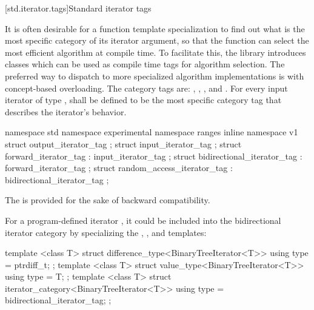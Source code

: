 [std.iterator.tags]{Standard iterator tags}

\pnum
{}%
%
%
%
%
It is often desirable for a
function template specialization
to find out what is the most specific category of its iterator
argument, so that the function can select the most efficient algorithm at compile time.
To facilitate this, the
library introduces
classes which can be used as compile time tags for algorithm selection.
\enternote The preferred way to dispatch to more specialized algorithm implementations is
with concept-based overloading.\exitnote
The category tags are:
,
,
,
and
.
For every input iterator of type
,
shall be defined to be the most specific category tag that describes the
iterator's behavior.

\begin{codeblock}
namespace std { namespace experimental { namespace ranges { inline namespace v1 {
  struct output_iterator_tag { };
  struct input_iterator_tag { };
  struct forward_iterator_tag : input_iterator_tag { };
  struct bidirectional_iterator_tag : forward_iterator_tag { };
  struct random_access_iterator_tag : bidirectional_iterator_tag { };
}}}}
\end{codeblock}

\pnum
\enternote
The  is provided for the sake of backward compatibility.
\exitnote

\pnum
{}%
%
%
%
%
%
\enterexample
For a program-defined iterator
,
it could be included
into the bidirectional iterator category by specializing the
, , and
 templates:

\begin{codeblock}
template <class T> struct difference_type<BinaryTreeIterator<T>> {
  using type = ptrdiff_t;
};
template <class T> struct value_type<BinaryTreeIterator<T>> {
  using type = T;
};
template <class T> struct iterator_category<BinaryTreeIterator<T>> {
  using type = bidirectional_iterator_tag;
};
\end{codeblock}
\exitexample

